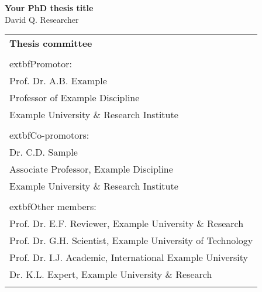\thispagestyle{empty}
\begin{center}
\Huge{\textbf{Your PhD thesis title}} \\
\vspace*{1cm}
\vspace*{1cm}
\vspace*{\fill}
\large{David Q. Researcher}\\
\end{center}

\newpage
\thispagestyle{empty}
\vspace*{\fill}
\begin{tabular}{l}
    \textbf{Thesis committee}                                                                 \\  
                                                                                              \\  
    	extbf{Promotor:}                                                                        \\
    Prof. Dr. A.B. Example                                                                 \\
    Professor of Example Discipline                                                   \\
    Example University \& Research Institute                                                   \\
                                                                                              \\  
    	extbf{Co-promotors:}                                                                    \\
    Dr. C.D. Sample                                                                    \\
    Associate Professor, Example Discipline                             \\
    Example University \& Research Institute                                           \\
                                                                                              \\  

    	extbf{Other members:}                                                                   \\
    Prof. Dr. E.F. Reviewer, Example University \& Research          \\
    Prof. Dr. G.H. Scientist, Example University of Technology                   \\
    Prof. Dr. I.J. Academic, International Example University                                   \\
    Dr. K.L. Expert, Example University \& Research                                  \\
    \\  


\end{tabular}
